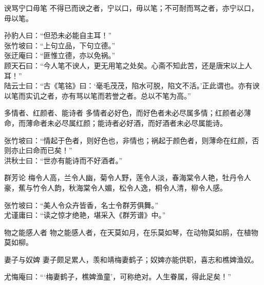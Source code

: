 \begin{yulu}{谀骂宁口毋笔}
不得已而谀之者，宁以口，毋以笔；不可耐而骂之者，亦宁以口，毋以笔。
\begin{comments}
孙豹人曰：“但恐未必能自主耳！” \\
张竹坡曰：“上句立品，下句立德。” \\
张迂庵曰：“匪惟立德，亦以免祸。” \\
顾天石曰：“今人笔不谀人，更无用笔之处矣。心斋不知此苦，还是唐宋以上人耳！” \\
陆云士曰：“古《笔铭》曰：‘毫毛茂茂，陷水可脱，陷文不活。’正此谓也。亦有谀以笔而实讥之者，亦有骂以笔而若誉之者。总以不笔为高。”
\end{comments}
\end{yulu}

\begin{yulu}{多情者、红颜者、能诗者}
多情者必好色，而好色者未必尽属多情；红颜者必薄命，而薄命者未必尽属红颜；能诗者必好酒，而好酒者未必尽属能诗。
\begin{comments}
张竹坡曰：“情起于色者，则好色也，非情也；祸起于颜色者，则薄命在红颜，否则亦止曰命而已矣！” \\
洪秋士曰：“世亦有能诗而不好酒者。”
\end{comments}
\end{yulu}

\begin{yulu}{群芳论}
梅令人高，兰令人幽，菊令人野，莲令人淡，春海棠令人艳，牡丹令人豪，蕉与竹令人韵，秋海棠令人媚，松令人逸，桐令人清，柳令人感。
\begin{comments}
张竹坡曰：“美人令众卉皆香，名士令群芳俱舞。” \\
尤谨庸曰：“读之惊才绝艳，堪采入《群芳谱》中。”
\end{comments}
\end{yulu}

\begin{yulu}{物之能感人者}
物之能感人者，在天莫如月，在乐莫如琴，在动物莫如鹃，在植物莫如柳。
\begin{comments}

\end{comments}
\end{yulu}

\begin{yulu}{妻子与奴婢}
妻子颇足累人，羡和靖梅妻鹤子；奴婢亦能供职，喜志和樵婢渔奴。
\begin{comments}
尤悔庵曰：“‘梅妻鹤子，樵婢渔童’，可称绝对。人生眷属，得此足矣！”
\end{comments}
\end{yulu}

